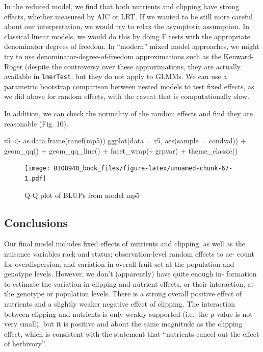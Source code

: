 \documentclass[
  12pt,
]{book}
\newenvironment{Shaded}{\begin{snugshade}}{\end{snugshade}}
\newcommand{\AttributeTok}[1]{\textcolor[rgb]{0.77,0.63,0.00}{#1}}
\newcommand{\FunctionTok}[1]{\textcolor[rgb]{0.00,0.00,0.00}{#1}}
\newcommand{\NormalTok}[1]{#1}
\newcommand{\OtherTok}[1]{\textcolor[rgb]{0.56,0.35,0.01}{#1}}
\newcommand{\SpecialCharTok}[1]{\textcolor[rgb]{0.00,0.00,0.00}{#1}}
\begin{document}
In the reduced model, we find that both nutrients and clipping have strong effects, whether measured by AIC or LRT. If we wanted to be still more careful about our interpretation, we would try to relax the asymptotic assumption. In classical linear models, we would do this by doing F tests with the appropriate denominator degrees of freedom. In ``modern'' mixed model approaches, we might try to use denominator-degree-of-freedom approximations such as the Kenward-Roger (despite the controversy over these approximations, they are actually available in \texttt{lmerTest}, but they do not apply to GLMMs. We can use a parametric bootstrap comparison between nested models to test fixed effects, as we did above for random effects, with the caveat that is computationally slow.

In addition, we can check the normality of the random effects and find they are reasonable (Fig. 10).

\begin{Shaded}
\begin{Highlighting}[]
\NormalTok{r5 }\OtherTok{\textless{}{-}} \FunctionTok{as.data.frame}\NormalTok{(}\FunctionTok{ranef}\NormalTok{(mp5))}
\FunctionTok{ggplot}\NormalTok{(}\AttributeTok{data =}\NormalTok{ r5, }\FunctionTok{aes}\NormalTok{(}\AttributeTok{sample =}\NormalTok{ condval)) }\SpecialCharTok{+}
  \FunctionTok{geom\_qq}\NormalTok{() }\SpecialCharTok{+} \FunctionTok{geom\_qq\_line}\NormalTok{() }\SpecialCharTok{+}
  \FunctionTok{facet\_wrap}\NormalTok{(}\SpecialCharTok{\textasciitilde{}}\NormalTok{ grpvar) }\SpecialCharTok{+}
  \FunctionTok{theme\_classic}\NormalTok{()}
\end{Highlighting}
\end{Shaded}

\begin{figure}
\centering
\texttt{[image: BIO8940\_book\_files/figure-latex/unnamed-chunk-67-1.pdf]}
\caption{\label{fig:unnamed-chunk-67}Q-Q plot of BLUPs from model mp5}
\end{figure}

\hypertarget{conclusions}{%
\subsection{Conclusions}\label{conclusions}}

Our final model includes fixed effects of nutrients and clipping, as well as the nuisance variables rack and status; observation-level random effects to ac- count for overdispersion; and variation in overall fruit set at the population and genotype levels. However, we don't (apparently) have quite enough in- formation to estimate the variation in clipping and nutrient effects, or their interaction, at the genotype or population levels. There is a strong overall positive effect of nutrients and a slightly weaker negative effect of clipping. The interaction between clipping and nutrients is only weakly supported (i.e.~the p-value is not very small), but it is positive and about the same magnitude as the clipping effect, which is consistent with the statement that ``nutrients cancel out the effect of herbivory''.
\end{document}
